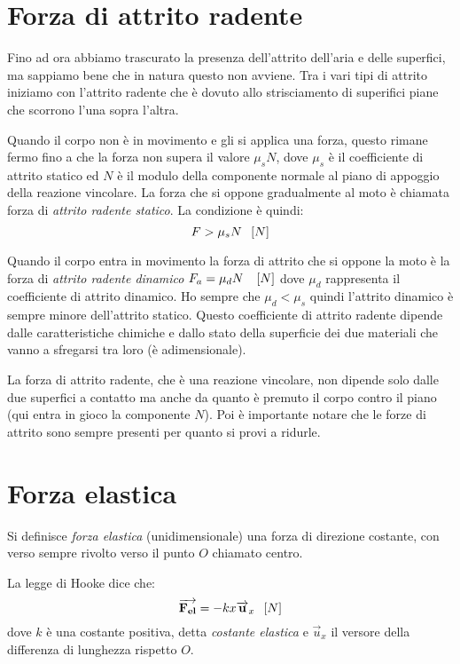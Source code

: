 \documentclass[class=book, crop=false, oneside, 12pt]{standalone}
\begin{document}
\section{Forza di attrito radente}

Fino ad ora abbiamo trascurato la presenza dell'attrito dell'aria e delle superfici, ma sappiamo bene che in natura questo non avviene.
Tra i vari tipi di attrito iniziamo con l'attrito radente che è dovuto allo strisciamento di superifici piane che scorrono l'una sopra l'altra.

Quando il corpo non è in movimento e gli si applica una forza, questo rimane fermo fino a che la forza non supera il valore \(\mu_s N\),
dove \(\mu_s\) è il coefficiente di attrito statico ed \(N\) è il modulo della componente normale al piano di appoggio della reazione vincolare.
La forza che si oppone gradualmente al moto è chiamata forza di \emph{attrito radente statico}.
La condizione è quindi:
\begin{equation*}
    F > \mu_s N \hspace{0.2cm} \left[N\right]
\end{equation*}

Quando il corpo entra in movimento la forza di attrito che si oppone la moto è la forza di \emph{attrito radente dinamico} \(F_a = \mu_d N \ \hspace{0.2cm} \left[N\right]\) dove \(\mu_d\) rappresenta il coefficiente di attrito dinamico.
Ho sempre che \(\mu_d < \mu_s\) quindi l'attrito dinamico è sempre minore dell'attrito statico.
Questo coefficiente di attrito radente dipende dalle caratteristiche chimiche e dallo stato della superficie dei due materiali che vanno a sfregarsi tra loro (è adimensionale).

La forza di attrito radente, che è una reazione vincolare, non dipende solo dalle due superfici a contatto ma anche da quanto è premuto il corpo contro il piano (qui entra in gioco la componente \(N\)).
Poi è importante notare che le forze di attrito sono sempre presenti per quanto si provi a ridurle.

\section{Forza elastica}

Si definisce \emph{forza elastica} (unidimensionale) una forza di direzione costante, con verso sempre rivolto verso il punto \(O\) chiamato centro.

La legge di Hooke dice che:
\begin{equation}
    \overrightarrow{F_{el}} = -k x \overrightarrow{u}_x \udm{N} 
\end{equation}
dove \(k\) è una costante positiva, detta \emph{costante elastica} e \(\overrightarrow{u}_x\) il versore della differenza di lunghezza rispetto \(O\).
\end{document}
